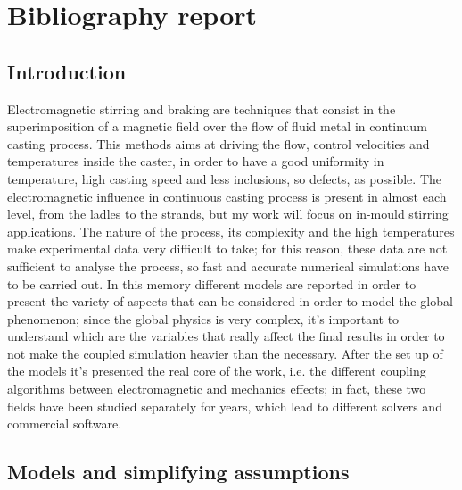\newpage
\pagestyle{fancy}
\chapter{Bibliography report}

 
 
 \section{Introduction}
 Electromagnetic stirring and braking are techniques that consist in the superimposition of a magnetic field over the flow of fluid metal in continuum casting process. This methods aims at driving the flow, control velocities and temperatures inside the caster, in order to have a good uniformity in temperature, high casting speed and less inclusions, so defects, as possible. The electromagnetic influence in continuous casting process is present in almost each level, from the ladles to the strands, but my work will focus on in-mould stirring applications. The nature of the process, its complexity and the high temperatures make experimental data very difficult to take; for this reason, these data are not sufficient to analyse the process, so fast and accurate numerical simulations have to be carried out. In this memory different models are reported in order to present the variety of aspects that can be considered in order to model the global phenomenon; since the global physics is very complex, it's important to understand which are the variables that really affect the final results in order to not make the coupled simulation heavier than the necessary. After the set up of the models it's presented the real core of the work, i.e. the different coupling algorithms between electromagnetic and mechanics effects; in fact, these two fields have been studied separately for years, which lead to different solvers and commercial software.
 



\section{Models and simplifying assumptions}
